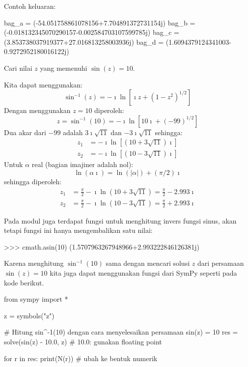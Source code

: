 Contoh keluaran:
\begin{textcode}
bag_a =  (-54.051758861078156+7.704891372731154j)
bag_b =  (-0.018132345070290157-0.002584703107599785j)
bag_c =  (3.853738037919377+27.016813258003936j)
bag_d =  (1.6094379124341003-0.9272952180016122j)
\end{textcode}


\begin{contoh}
Cari nilai $z$ yang memenuhi $\sin(z) = 10$.

Kita dapat menggunakan:
\begin{equation*}
\sin^{-1}(z) = -\imath \ln\left[\imath z+\left(1-z^{2}\right)^{1/2}\right]
\end{equation*}
Dengan menggunakan $z = 10$ diperoleh:
\begin{equation*}
z = \sin^{-1}(10) = -\imath \ln \left[ 10\imath + (-99)^{1/2} \right]
\end{equation*}
Dua akar dari $-99$ adalah $3\imath\sqrt{11}$ dan $-3\imath\sqrt{11}$ sehingga:
\begin{align*}
z_1 & = -\imath \ln\left[ (10 + 3\sqrt{11})\imath \right] \\
z_2 & = -\imath \ln\left[ (10 - 3\sqrt{11})\imath \right]
\end{align*}
Untuk $\alpha$ real (bagian imajiner adalah nol):
\begin{equation*}
\ln(\alpha \imath) = \ln(|\alpha|) + (\pi/2)\imath
\end{equation*}
sehingga diperoleh:
\begin{align*}
z_1 & = \frac{\pi}{2} - \imath \ln(10 + 3\sqrt{11}) = \frac{\pi}{2} - 2.993\imath \\
z_2 & = \frac{\pi}{2} - \imath \ln(10 - 3\sqrt{11}) = \frac{\pi}{2} + 2.993\imath
\end{align*}

\end{contoh}

Pada modul  juga terdapat fungsi  untuk menghitung
invers fungsi sinus, akan tetapi fungsi ini hanya mengembalikan satu nilai:
\begin{pyconcode}
>>> cmath.asin(10)
(1.5707963267948966+2.993222846126381j)
\end{pyconcode}

Karena menghitung $\sin^{-1}(10)$ sama dengan mencari solusi $z$ dari persamaan
$\sin(z) = 10$ kita juga dapat menggunakan fungsi  dari SymPy
seperti pada kode berikut.
\begin{pythoncode}
from sympy import *

z = symbols("z")

# Hitung sin^{-1}(10) dengan cara menyelesaikan persamaan sin(z) = 10
res = solve(sin(z) - 10.0, z)
# 10.0: gunakan floating point

for r in res:
    print(N(r)) # ubah ke bentuk numerik
\end{pythoncode}

